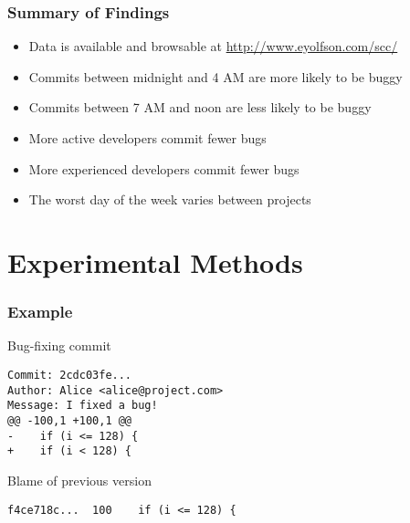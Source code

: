 \documentclass[aspectratio=43]{beamer}
\begin{document}
\begin{frame}
  \frametitle{Summary of Findings}
  
  \begin{itemize}
    \item Data is available and browsable at \url{http://www.eyolfson.com/scc/}

    \item Commits between midnight and 4 AM are more likely to be buggy

    \item Commits between 7 AM and noon are less likely to be buggy

    \item More active developers commit fewer bugs

    \item More experienced developers commit fewer bugs

    \item The worst day of the week varies between projects
  \end{itemize}
\end{frame}

\section{Experimental Methods}
\begin{frame}[fragile]
  \frametitle{Example}

  \begin{block}{Bug-fixing commit}
    \begin{lstlisting}
Commit: 2cdc03fe...
Author: Alice <alice@project.com>
Message: I fixed a bug!
@@ -100,1 +100,1 @@
-    if (i <= 128) {
+    if (i < 128) {
    \end{lstlisting}
  \end{block}

  \begin{block}{Blame of previous version}
    \begin{lstlisting}
f4ce718c...  100    if (i <= 128) {
    \end{lstlisting}
  \end{block}

\end{frame}
\end{document}
